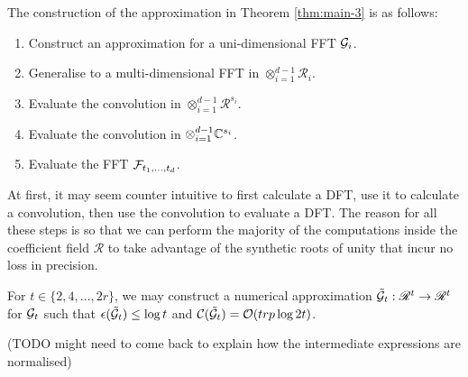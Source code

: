 The construction of the approximation in Theorem \ref{thm:main-3} is as follows:
\begin{enumerate}
    \item Construct an approximation for a uni-dimensional FFT $\mathcal G_i$.
    \item Generalise to a multi-dimensional FFT in $\otimes_{i=1}^{d-1} \mathscr{R}_i$.
    \item Evaluate the convolution in $\otimes_{i=1}^{d-1} \mathscr{R}^{s_i}$.
    \item Evaluate the convolution in $\otimes_{i=1}^{d-1} {\mathbb C}^{s_i}$.
    \item Evaluate the FFT $\mathcal F_{t_1, \ldots, t_d}$.
\end{enumerate}

At first, it may seem counter intuitive to first calculate a DFT, use it to calculate a convolution, then use the convolution to evaluate a DFT. The reason for all these steps is so that we can perform the majority of the computations inside the coefficient field $\mathscr{R}$ to take advantage of the synthetic roots of unity that incur no loss in precision.

\begin{lemma}
    For $t \in \{2, 4, \ldots, 2r\}$, we may construct a numerical approximation $\tilde{\mathcal G}_t: \mathscr{R}^t \to \mathscr{R}^t$ for $\mathcal G_t$ such that $\epsilon (\tilde{\mathcal G}_t) \leq \log t$ and $\mathcal C(\tilde{\mathcal G}_t)= \mathcal O(trp \log 2t)$.
\end{lemma}

(TODO might need to come back to explain how the intermediate expressions are normalised)
\medskip

